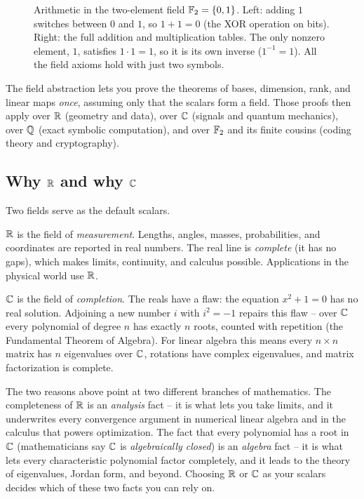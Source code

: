 \begin{figure}[H]
\caption{Arithmetic in the two-element field $\mathbb{F}_2 = \{0,1\}$. Left: adding $1$ switches
between $0$ and $1$, so $1+1=0$ (the XOR operation on bits). Right: the full addition and
multiplication tables. The only nonzero element, $1$, satisfies $1 \cdot 1 = 1$, so it is
its own inverse ($1^{-1} = 1$). All the field axioms hold with just two symbols.}
\label{ch38:f2-arithmetic}
\end{figure}

\begin{aestheticbox}
The field abstraction lets you prove the theorems of bases,
dimension, rank, and linear maps \emph{once}, assuming only that the scalars form a field.
Those proofs then apply over $\mathbb{R}$ (geometry and data), over $\mathbb{C}$ (signals and quantum
mechanics), over $\mathbb{Q}$ (exact symbolic computation), and over
$\mathbb{F}_2$ and its finite cousins (coding theory and cryptography).
\end{aestheticbox}

\subsection{Why $\mathbb{R}$ and why $\mathbb{C}$}

Two fields serve as the default scalars.

$\mathbb{R}$ is the field of \emph{measurement}. Lengths, angles, masses, probabilities, and
coordinates are reported in real numbers. The real
line is \emph{complete} (it has no gaps), which makes limits, continuity, and
calculus possible. Applications in the physical world use $\mathbb{R}$.

$\mathbb{C}$ is the field of \emph{completion}. The reals have a flaw: the equation
$x^2 + 1 = 0$ has no real solution. Adjoining a new number $i$ with $i^2 = -1$
repairs this flaw -- over $\mathbb{C}$ every polynomial of degree $n$ has exactly
$n$ roots, counted with repetition (the Fundamental Theorem of Algebra). For linear
algebra this means every $n\times n$ matrix has $n$ eigenvalues over $\mathbb{C}$, rotations have complex eigenvalues, and matrix factorization is complete.

\begin{connectionbox}
The two reasons above point at two different branches of mathematics. The completeness of
$\mathbb{R}$ is an \emph{analysis} fact -- it is what lets you take limits, and it underwrites
every convergence argument in numerical linear algebra and in the calculus that powers
optimization. The fact that every polynomial has a root in $\mathbb{C}$ (mathematicians say $\mathbb{C}$
is \emph{algebraically closed}) is an \emph{algebra} fact -- it is what lets every
characteristic polynomial factor completely, and it leads to the theory of eigenvalues,
Jordan form, and beyond. Choosing $\mathbb{R}$ or $\mathbb{C}$ as your scalars decides which of these two
facts you can rely on.
\end{connectionbox}

